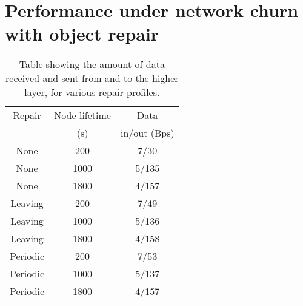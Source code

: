 

\section{Performance under network churn with object repair}


\begin{table}[htbp]
\centering
\begin{tabular}{|c|c|c|}
\hline
Repair   &Node lifetime& Data\\
         &     (s)     &in/out (Bps)\\
\hline
None     & 200         &     7/30\\
None     & 1000        &     5/135\\
None     & 1800        &     4/157\\
Leaving  & 200         &     7/49\\
Leaving  & 1000        &     5/136\\
Leaving  & 1800        &     4/158\\
Periodic & 200         &     7/53\\
Periodic & 1000        &     5/137\\
Periodic & 1800        &     4/157\\
\hline
\end{tabular}
\caption{Table showing the amount of data received and sent from and to the higher layer, for various repair profiles.}
\label{tab_repair_data}
\end{table}


